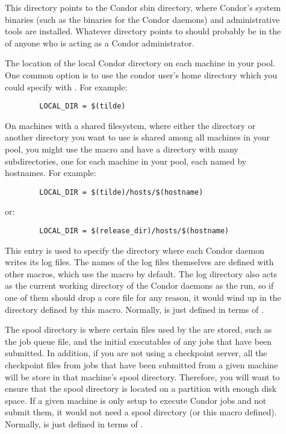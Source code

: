 \begin{description}
\item[] \label{param:Sbin} This directory points to the
  Condor sbin directory, where Condor's system binaries (such as the
  binaries for the Condor daemons) and administrative tools are
  installed.  Whatever directory  points to should
  probably be in the  of anyone who is acting as a Condor
  administrator.

\item[] \label{param:LocalDir} The location of the
  local Condor directory on each machine in your pool.  One common
  option is to use the condor user's home directory which you could
  specify with .  For example:
\begin{verbatim}
        LOCAL_DIR = $(tilde)
\end{verbatim}
  
  On machines with a shared filesystem, where either the
   directory or another directory you want to use is
  shared among all machines in your pool, you might use the
   macro and have a directory with many
  subdirectories, one for each machine in your pool, each named by
  hostnames.  For example:
\begin{verbatim}
        LOCAL_DIR = $(tilde)/hosts/$(hostname)      
\end{verbatim}
  or:
\begin{verbatim}
        LOCAL_DIR = $(release_dir)/hosts/$(hostname)
\end{verbatim}
  
\item[] \label{param:Log} This entry is used to specify the
  directory where each Condor daemon writes its log files.  The names
  of the log files themselves are defined with other macros, which use
  the  macro by default.  The log directory also acts as
  the current working directory of the Condor daemons as the run, so
  if one of them should drop a core file for any reason, it would wind
  up in the directory defined by this macro.  Normally,  is
  just defined in terms of .
  
\item[] \label{param:Spool} The spool directory is where
  certain files used by the  are stored, such as the
  job queue file, and the initial executables of any jobs that have
  been submitted.  In addition, if you are not using a checkpoint
  server, all the checkpoint files from jobs that have been submitted
  from a given machine will be store in that machine's spool
  directory.  Therefore, you will want to ensure that the spool
  directory is located on a partition with enough disk space.  If a
  given machine is only setup to execute Condor jobs and not submit
  them, it would not need a spool directory (or this macro defined).
  Normally,  is just defined in terms of
  .
  

\end{description}
